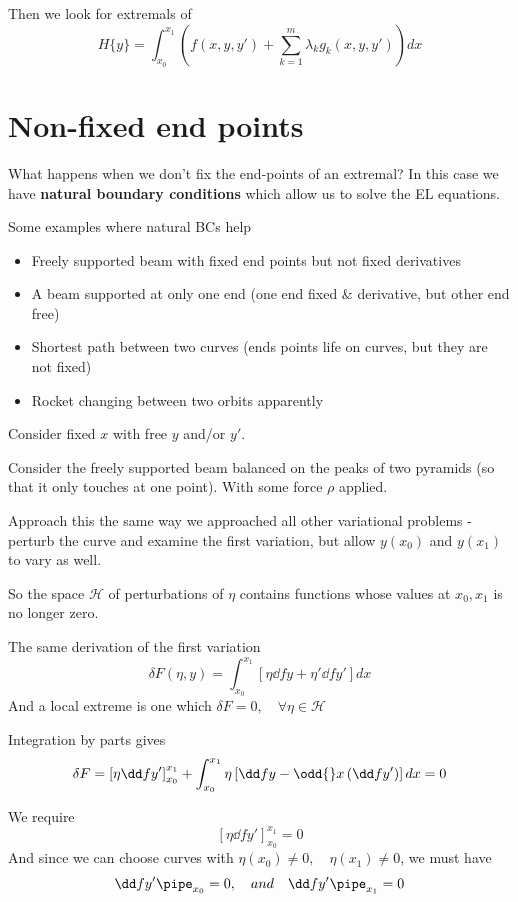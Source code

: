 \documentclass{X:/Documents/Coding/Latex/myassignment}
\begin{document}
Then we look for extremals of
\[H\{y\} = \int_{x_0}^{x_1} \left(f(x,y,y') + \sum_{k=1}^m \lambda_k g_k(x,y,y')\right) dx\]


\section{Non-fixed end points}
What happens when we don't fix the end-points of an extremal?
In this case we have \textbf{natural boundary conditions} which allow us to solve the EL equations.

Some examples where natural BCs help
\begin{itemize}
	\item Freely supported beam with fixed end points but not fixed derivatives
	\item A beam supported at only one end (one end fixed \& derivative, but other end free)
	\item Shortest path between two curves (ends points life on curves, but they are not fixed)
	\item Rocket changing between two orbits apparently
\end{itemize}

Consider fixed $x$ with free $y$ and/or $y'$.

Consider the freely supported beam balanced on the peaks of two pyramids (so that it only touches at one point). With some force $\rho$ applied.

Approach this the same way we approached all other variational problems - perturb the curve and examine the first variation, but allow $y(x_0)$ and $y(x_1)$ to vary as well.

So the space $\mathcal{H}$ of perturbations of $\eta$ contains functions whose values at $x_0,x_1$ is no longer zero.

The same derivation of the first variation
\[\delta F(\eta,y) = \int_{x_0}^{x_1} \left[\eta \dd fy + \eta' \dd f{y'}\right] dx \]
And a local extreme is one which $\delta F = 0, \quad \forall \eta \in \mathcal{H}$

Integration by parts gives
\[\delta F = \left[\eta \dd f{y'}\right]_{x_0}^{x_1} + \int_{x_0}^{x_1} \eta \left[\dd fy - \odd{}x \left(\dd f{y'}\right)\right] dx = 0\]

We require 
\[\left[\eta \dd f{y'}\right]_{x_0}^{x_1}  =0\]
And since we can choose curves with $\eta(x_0) \neq 0, \quad \eta(x_1) \neq 0$, we must have
\[\dd f{y'}\pipe_{x_0} = 0, \quad and \quad \dd f{y'}\pipe_{x_1} = 0\]
\end{document}
